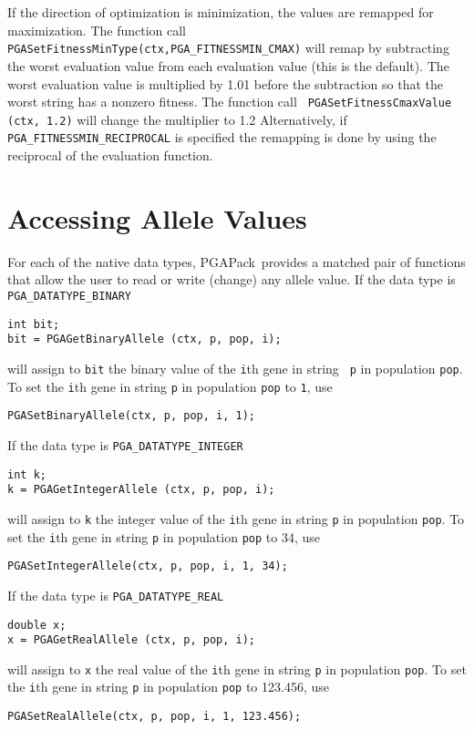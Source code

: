 \documentclass{report}
\newcommand{\pga}{PGAPack}
\begin{document}
If the direction of optimization is minimization, the values are remapped for
maximization.  The function call {\tt
PGASetFitnessMinType(ctx,PGA\_FITNESSMIN\_CMAX)} will remap by subtracting the
worst evaluation value from each evaluation value (this is the default).  The
worst evaluation value is multiplied by 1.01 before the subtraction so that
the worst string has a nonzero fitness.  The function call {\tt
PGASetFitnessCmaxValue (ctx, 1.2)} will change the multiplier to 1.2
Alternatively, if {\tt PGA\_FITNESSMIN\_RECIPROCAL} is specified the remapping
is done by using the reciprocal of the evaluation function.

\section{Accessing Allele Values}\label{sec:allele-access}

For each of the native data types, \pga\ provides a matched pair of functions
that allow the user to read or write (change) any allele value.  If the data
type is {\tt PGA\_DATATYPE\_BINARY}
\begin{verbatim}
int bit;
bit = PGAGetBinaryAllele (ctx, p, pop, i);
\end{verbatim}
will assign to {\tt bit} the binary value of the {\tt i}th gene in string {\tt
p} in population {\tt pop}.  To set the {\tt i}th gene in string {\tt p} in
population {\tt pop} to {\tt 1}, use
\begin{verbatim}
PGASetBinaryAllele(ctx, p, pop, i, 1);
\end{verbatim}

If the data type is {\tt PGA\_DATATYPE\_INTEGER}
\begin{verbatim}
int k;
k = PGAGetIntegerAllele (ctx, p, pop, i);
\end{verbatim}
will assign to {\tt k} the integer value of the {\tt i}th gene in string
{\tt p} in population {\tt pop}.  
To set the {\tt i}th gene in string
{\tt p} in population {\tt pop} to 34, use
\begin{verbatim}
PGASetIntegerAllele(ctx, p, pop, i, 1, 34);
\end{verbatim}

If the data type is {\tt PGA\_DATATYPE\_REAL}
\begin{verbatim}
double x;
x = PGAGetRealAllele (ctx, p, pop, i);
\end{verbatim}
will assign to {\tt x} the real value of the {\tt i}th gene in string {\tt p}
in population {\tt pop}.
To set the {\tt i}th gene in string
{\tt p} in population {\tt pop} to 123.456, use
\begin{verbatim}
PGASetRealAllele(ctx, p, pop, i, 1, 123.456);
\end{verbatim}
\end{document}
